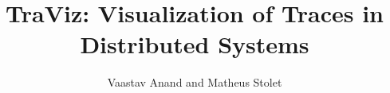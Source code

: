 \documentclass[journal]{vgtc}
\title{TraViz: Visualization of Traces in Distributed Systems}
\author{Vaastav Anand and Matheus Stolet}
\date{}
\begin{document}
\maketitle















\balance
{\footnotesize


}
\end{document}
